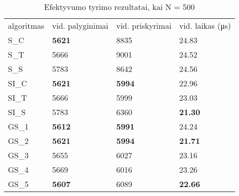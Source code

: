 \documentclass{VUMIFInfKursinis}
\begin{document}
\begin{table}[H]
  \caption{Efektyvumo tyrimo rezultatai, kai N = 500}
  \label{results_500}
  \centering
  \begin{tabular}{@{}llll@{}}
  algoritmas & vid. palyginimai                      & vid. priskyrimai                      & vid. laikas (μs)                       \\
  S\_C       & \cellcolor[HTML]{70AD47}\textbf{5621} & 8835                                  & 24.83                                  \\
  S\_T       & 5666                                  & 9001                                  & 24.52                                  \\
  S\_S       & 5783                                  & 8642                                  & 24.56                                  \\
  SI\_C      & \cellcolor[HTML]{70AD47}\textbf{5621} & \cellcolor[HTML]{70AD47}\textbf{5994} & 22.96                                  \\
  SI\_T      & 5666                                  & 5999                                  & 23.03                                  \\
  SI\_S      & 5783                                  & 6360                                  & \cellcolor[HTML]{70AD47}\textbf{21.30} \\
  GS\_1      & \cellcolor[HTML]{70AD47}\textbf{5612} & \cellcolor[HTML]{70AD47}\textbf{5991} & 24.24                                  \\
  GS\_2 & \cellcolor[HTML]{70AD47}\textbf{5621} & \cellcolor[HTML]{70AD47}\textbf{5994} & \cellcolor[HTML]{70AD47}\textbf{21.71} \\
  GS\_3      & 5655                                  & 6027                                  & 23.16                                  \\
  GS\_4      & 5669                                  & 6016                                  & 23.26                                  \\
  GS\_5      & \cellcolor[HTML]{70AD47}\textbf{5607} & 6089                                  & \cellcolor[HTML]{70AD47}\textbf{22.66}
  \end{tabular}
\end{table}
\end{document}

